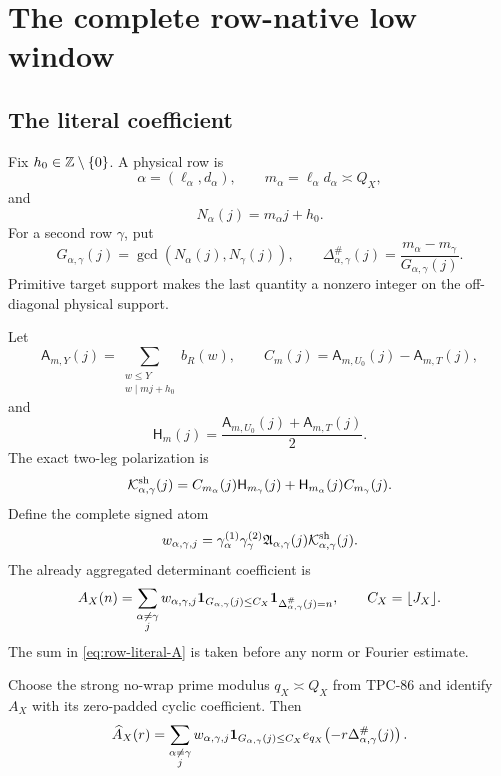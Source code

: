 \section{The complete row-native low window}
\label{sec:row-window}

\subsection{The literal coefficient}

Fix \(h_0\in\mathbb Z\setminus\{0\}\).  A physical row is
\[
 \alpha=(\ell_\alpha,d_\alpha),\qquad
 m_\alpha=\ell_\alpha d_\alpha\asymp Q_X,
\]
and
\[
 N_\alpha(j)=m_\alpha j+h_0.
\]
For a second row \(\gamma\), put
\begin{equation}
 G_{\alpha,\gamma}(j)
 =
 \gcd(N_\alpha(j),N_\gamma(j)),\qquad
 \Delta^\#_{\alpha,\gamma}(j)
 =
 \frac{m_\alpha-m_\gamma}{G_{\alpha,\gamma}(j)}.
\label{eq:row-content-determinant}
\end{equation}
Primitive target support makes the last quantity a nonzero integer
on the off-diagonal physical support.

Let
\[
 \mathsf A_{m,Y}(j)
 =
 \sum_{\substack{w\le Y\\w\mid mj+h_0}}b_R(w),
\qquad
 C_m(j)=\mathsf A_{m,U_0}(j)-\mathsf A_{m,T}(j),
\]
and
\[
 \mathsf H_m(j)
 =
 \frac{\mathsf A_{m,U_0}(j)+\mathsf A_{m,T}(j)}2.
\]
The exact two-leg polarization is
\begin{equation}
 \mathcal K^{\rm sh}_{\alpha,\gamma}(j)
 =
 C_{m_\alpha}(j)\mathsf H_{m_\gamma}(j)
 +
 \mathsf H_{m_\alpha}(j)C_{m_\gamma}(j).
\label{eq:row-polarization}
\end{equation}
Define the complete signed atom
\begin{equation}
 w_{\alpha,\gamma,j}
 =
 \gamma_\alpha^{(1)}\gamma_\gamma^{(2)}
 \mathfrak A_{\alpha,\gamma}(j)
 \mathcal K^{\rm sh}_{\alpha,\gamma}(j).
\label{eq:row-complete-atom}
\end{equation}
The already aggregated determinant coefficient is
\begin{equation}
 A_X(n)
 =
 \sum_{\substack{\alpha\ne\gamma\\j}}
 w_{\alpha,\gamma,j}
 \mathbf 1_{G_{\alpha,\gamma}(j)\le C_X}
 \mathbf 1_{\Delta^\#_{\alpha,\gamma}(j)=n},
\qquad C_X=\lfloor J_X\rfloor.
\label{eq:row-literal-A}
\end{equation}
The sum in \eqref{eq:row-literal-A} is taken before any norm or
Fourier estimate.

Choose the strong no-wrap prime modulus \(q_X\asymp Q_X\) from
TPC-86 and identify \(A_X\) with its zero-padded cyclic coefficient.
Then
\begin{equation}
 \widehat A_X(r)
 =
 \sum_{\substack{\alpha\ne\gamma\\j}}
 w_{\alpha,\gamma,j}
 \mathbf 1_{G_{\alpha,\gamma}(j)\le C_X}
 e_{q_X}\!\left(
 -r\Delta^\#_{\alpha,\gamma}(j)\right).
\label{eq:row-Fourier-coefficient}
\end{equation}

